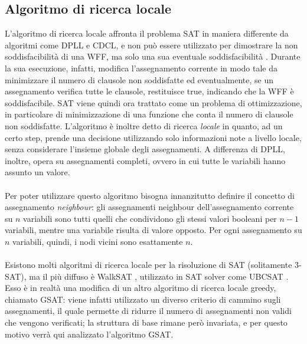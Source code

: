 \subsection{Algoritmo di ricerca locale}
L'algoritmo di ricerca locale affronta il problema SAT in maniera differente da algoritmi come DPLL e CDCL, e non
può essere utilizzato per dimostrare la non soddisfacibilità di una WFF, ma solo una sua eventuale soddisfacibilità
\cite{local-search-no-unsat}.
Durante la sua esecuzione, infatti, modifica l'assegnamento corrente in modo tale da minimizzare il numero
di clausole non soddisfatte ed eventualmente, se un assegnamento verifica tutte le clausole, restituisce true, indicando
che la WFF è soddisfacibile.
SAT viene quindi ora trattato come un problema di ottimizzazione, in particolare di minimizzazione di una funzione che conta il numero di clausole non soddisfatte.
L'algoritmo è inoltre detto di ricerca \textit{locale} in quanto, ad un certo step, prende una decisione utilizzando
solo informazioni note a livello locale, senza considerare l'insieme globale degli assegnamenti.
A differenza di DPLL, inoltre, opera su assegnamenti completi, ovvero in cui tutte le variabili hanno assunto un valore.\\
\\
Per poter utilizzare questo algoritmo bisogna innanzitutto definire il concetto di assegnamento \textit{neighbour}:
gli assegnamenti neighbour dell'assegnamento corrente su $n$ variabili sono tutti quelli che condividono 
gli stessi valori booleani per $n-1$ variabili, mentre una variabile risulta di valore opposto.
Per ogni assegnamento su $n$ variabili, quindi, i nodi vicini sono esattamente $n$. \\
\\
Esistono molti algoritmi di ricerca locale per la risoluzione di SAT (solitamente 3-SAT), ma il più
diffuso è WalkSAT \cite{walksat-og}, utilizzato in SAT solver come UBCSAT \cite{ubcsat-site}.
Esso è in realtà una modifica di un altro algoritmo di ricerca locale greedy, chiamato GSAT:
viene infatti utilizzato un diverso criterio di cammino sugli assegnamenti, il quale permette di ridurre il numero
di assegnamenti non validi che vengono verificati; la struttura di base rimane però invariata, e per questo motivo
verrà qui analizzato l'algoritmo GSAT.
